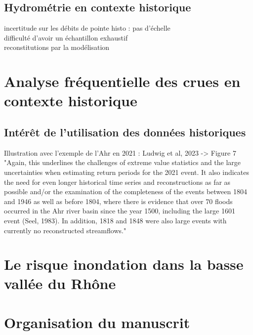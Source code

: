 \documentclass[11pt]{article}
\begin{document}
		\subsection{Hydrométrie en contexte historique}
		incertitude sur les débits de pointe histo : pas d'échelle\\
		difficulté d'avoir un échantillon exhaustif\\
		reconstitutions par la modélisation\\
	

			

		
\section{Analyse fréquentielle des crues en contexte historique}
		\subsection{Intérêt de l'utilisation des données historiques}
		
		Illustration avec l'exemple de l'Ahr en 2021 : Ludwig et al, 2023 -> Figure 7
		"Again, this underlines the challenges of extreme value
statistics and the large uncertainties when estimating return
periods for the 2021 event. It also indicates the need for
even longer historical time series and reconstructions as far
as possible and/or the examination of the completeness of
the events between 1804 and 1946 as well as before 1804,
where there is evidence that over 70 floods occurred in the
Ahr river basin since the year 1500, including the large 1601
event (Seel, 1983). In addition, 1818 and 1848 were also
large events with currently no reconstructed streamflows."


		
\section{Le risque inondation dans la basse vallée  du Rhône}

\section{Organisation du manuscrit}






\printbibliography
\end{document}
